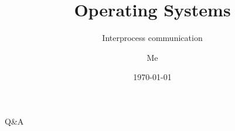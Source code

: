 \documentclass[12pt]{beamer}
\title{Operating Systems}
\subtitle{Interprocess communication}
\author{Me}
\date{\today}
\begin{document}
  \begin{frame}
    \titlepage
  \end{frame}

  
  
  
  
  
  
  
  

  \begin{frame}
  \begin{center}
  \Huge Q\&A
  \end{center}
  \end{frame}
\end{document}
